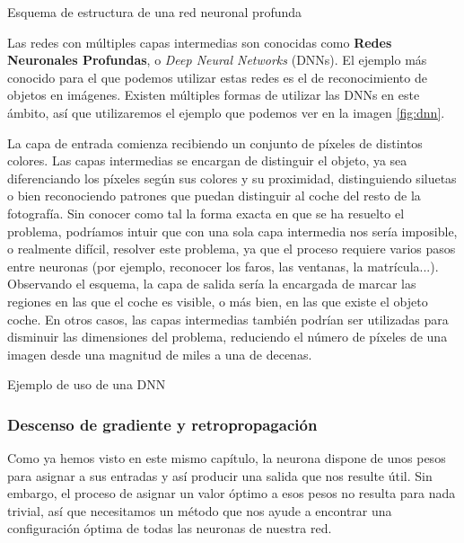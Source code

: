 %
       {Esquema de estructura de una red neuronal profunda}

Las redes con múltiples capas intermedias son conocidas como \textbf{Redes Neuronales Profundas}, o \textit{Deep Neural Networks} (DNNs). El ejemplo más conocido para el que podemos utilizar estas redes es el de reconocimiento de objetos en imágenes. Existen múltiples formas de utilizar las DNNs en este ámbito, así que utilizaremos el ejemplo que podemos ver en la imagen \ref{fig:dnn}. 

La capa de entrada comienza recibiendo un conjunto de píxeles de distintos colores. Las capas intermedias se encargan de distinguir el objeto, ya sea diferenciando los píxeles según sus colores y su proximidad, distinguiendo siluetas o bien reconociendo patrones que puedan distinguir al coche del resto de la fotografía. Sin conocer como tal la forma exacta en que se ha resuelto el problema, podríamos intuir que con una sola capa intermedia nos sería imposible, o realmente difícil, resolver este problema, ya que el proceso requiere varios pasos entre neuronas (por ejemplo, reconocer los faros, las ventanas, la matrícula...). Observando el esquema, la capa de salida sería la encargada de marcar las regiones en las que el coche es visible, o más bien, en las que existe el objeto coche. En otros casos, las capas intermedias también podrían ser utilizadas para disminuir las dimensiones del problema, reduciendo el número de píxeles de una imagen desde una magnitud de miles a una de decenas.

%
       {Ejemplo de uso de una DNN \citep{NIPS2013_5207}}    

\subsubsection{Descenso de gradiente y retropropagación}

Como ya hemos visto en este mismo capítulo, la neurona dispone de unos pesos para asignar a sus entradas y así producir una salida que nos resulte útil. Sin embargo, el proceso de asignar un valor óptimo a esos pesos no resulta para nada trivial, así que necesitamos un método que nos ayude a encontrar una configuración óptima de todas las neuronas de nuestra red.
 
